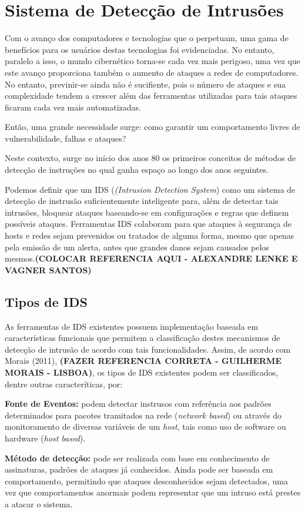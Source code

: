 \chapter{Sistema de Detecção de Intrusões}
\label{chap:IDS}

	Com o avanço dos computadores e tecnologias que o perpetuam, uma gama de benefícios para os usuários destas tecnologias foi evidenciadas. No entanto, paralelo a isso, o mundo cibernético torna-se cada vez mais perigoso, uma vez que este avanço proporciona também o aumento de ataques a redes de computadores. No entanto, previnir-se ainda não é sucifiente, pois o número de ataques e sua complexidade tendem a crescer além das ferramentas utilizadas para tais ataques ficaram cada vez mais automatizadas.

	Então, uma grande necessidade surge: como garantir um comportamento livres de vulnerabilidade, falhas e ataques?

	Neste contexto, surge no início dos anos 80 os primeiros conceitos de métodos de detecção de instruções no qual ganha espaço ao longo dos anos seguintes.

	Podemos definir que um IDS (\textit{(Intrusion Detection System}) como um sistema de detecção de instrusão suficientemente inteligente para, além de detectar tais intrusões, bloquear ataques baseando-se em configurações e regras que definem possíveis ataques. Ferramentas IDS colaboram para que ataques à segurança de hosts e redes sejam prevenidos ou tratados de alguma forma, mesmo que apenas pela emissão de um alerta, antes que grandes danos sejam causados pelos mesmos.\textbf{(COLOCAR REFERENCIA AQUI - ALEXANDRE LENKE E VAGNER SANTOS)}

	\section{Tipos de IDS}
	\label{sec:IDS_Tipos}

	As ferramentas de IDS existentes possuem implementação baseada em características funcionais que permitem a classificação destes mecanismos de detecção de intrusão de acordo com tais funcionalidades. Assim, de acordo com Morais (2011), \textbf{(FAZER REFERENCIA CORRETA - GUILHERME MORAIS - LISBOA)}, os tipos de IDS existentes podem ser classificados, dentre outras caracteríticas, por:
	\begin{list}{}{}
	\item \textbf{Fonte de Eventos:} podem detectar instrusos com referência aos padrões determinados para pacotes tramitados na rede (\textit{network based}) ou através do monitoramento de diversas variáveis de um \textit{host}, tais como uso de software ou hardware (\textit{host based}).
	
	\item \textbf{Método de detecção:} pode ser realizada com base em conhecimento de assinaturas, padrões de ataques já conhecidos. Ainda pode ser baseada em comportamento, permitindo que ataques desconhecidos sejam detectados, uma vez que comportamentos anormais podem representar que um intruso está prestes a atacar o sistema.	
	\end{list}

